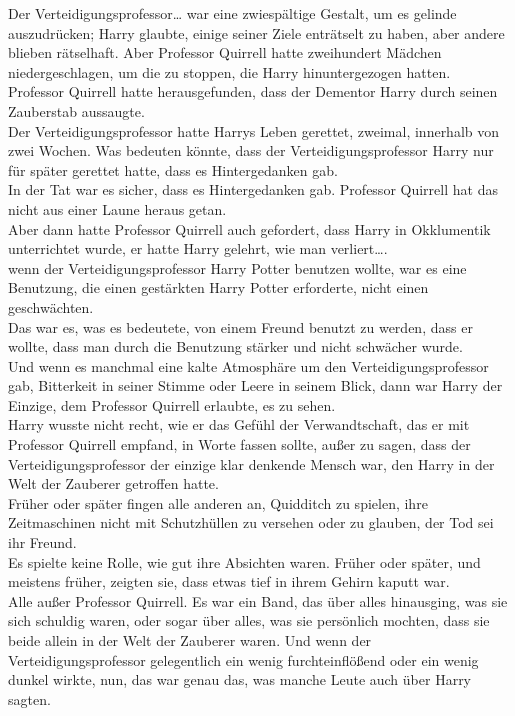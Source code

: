 {Der Verteidigungsprofessor… war eine zwiespältige Gestalt, um es gelinde auszudrücken; Harry glaubte, einige seiner Ziele enträtselt zu haben, aber andere blieben rätselhaft. Aber Professor Quirrell hatte zweihundert Mädchen niedergeschlagen, um die zu stoppen, die Harry hinuntergezogen hatten.\\ Professor Quirrell hatte herausgefunden, dass der Dementor Harry durch seinen Zauberstab aussaugte.\\ Der Verteidigungsprofessor hatte Harrys Leben gerettet, zweimal, innerhalb von zwei Wochen. Was bedeuten könnte, dass der Verteidigungsprofessor Harry nur für später gerettet hatte, dass es Hintergedanken gab.\\ In der Tat war es sicher, dass es Hintergedanken gab. Professor Quirrell hat das nicht aus einer Laune heraus getan.\\ Aber dann hatte Professor Quirrell auch gefordert, dass Harry in Okklumentik unterrichtet wurde, er hatte Harry gelehrt, wie man verliert….\\ wenn der Verteidigungsprofessor Harry Potter benutzen wollte, war es eine Benutzung, die einen gestärkten Harry Potter erforderte, nicht einen geschwächten.\\ Das war es, was es bedeutete, von einem Freund benutzt zu werden, dass er wollte, dass man durch die Benutzung stärker und nicht schwächer wurde.\\ Und wenn es manchmal eine kalte Atmosphäre um den Verteidigungsprofessor gab, Bitterkeit in seiner Stimme oder Leere in seinem Blick, dann war Harry der Einzige, dem Professor Quirrell erlaubte, es zu sehen.\\ Harry wusste nicht recht, wie er das Gefühl der Verwandtschaft, das er mit Professor Quirrell empfand, in Worte fassen sollte, außer zu sagen, dass der Verteidigungsprofessor der einzige klar denkende Mensch war, den Harry in der Welt der Zauberer getroffen hatte.\\ Früher oder später fingen alle anderen an, Quidditch zu spielen, ihre Zeitmaschinen nicht mit Schutzhüllen zu versehen oder zu glauben, der Tod sei ihr Freund.\\ Es spielte keine Rolle, wie gut ihre Absichten waren. Früher oder später, und meistens früher, zeigten sie, dass etwas tief in ihrem Gehirn kaputt war.\\ Alle außer Professor Quirrell. Es war ein Band, das über alles hinausging, was sie sich schuldig waren, oder sogar über alles, was sie persönlich mochten, dass sie beide allein in der Welt der Zauberer waren. Und wenn der Verteidigungsprofessor gelegentlich ein wenig furchteinflößend oder ein wenig dunkel wirkte, nun, das war genau das, was manche Leute auch über Harry sagten.

}

